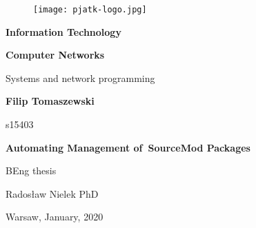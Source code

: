 \thispagestyle{empty}

\begin{figure}[H]
  \centering
  \texttt{[image: pjatk-logo.jpg]}
\end{figure}

\begin{center}

{\large \textbf{Information Technology}}

\vspace{1cm}

{\large \textbf{Computer Networks}}

\vspace{0.25cm}

Systems and network programming

\vspace{2cm}

{\large \textbf{Filip Tomaszewski}}

s15403

\vspace{1.5cm}

{\LARGE \textbf{Automating Management of~SourceMod Packages}}

\vspace{2cm}

\begin{flushright}

BEng thesis

Radosław Nielek PhD

\end{flushright}

\vspace{\fill}

Warsaw, January, 2020

\end{center}

\newpage
{}
\setcounter{page}{1}
